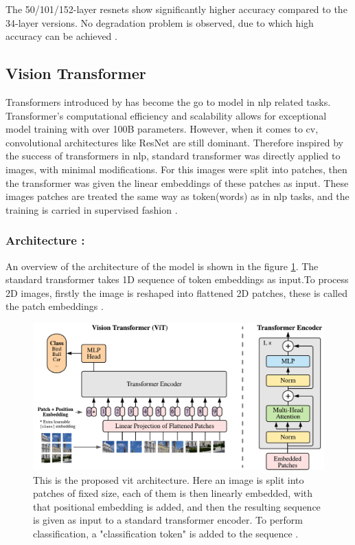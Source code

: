 The 50/101/152-layer \glspl{resnet} show significantly higher accuracy compared to the 34-layer versions. No degradation problem is observed, due to which high accuracy can be achieved \cite{he2016deep}.

\subsection{Vision Transformer}

Transformers introduced by \cite{vaswani2017attention} has become the go to model in \gls{nlp} related tasks. Transformer's computational efficiency and scalability allows for exceptional model training with over 100B parameters. However, when it comes to \gls{cv}, convolutional architectures like ResNet\cite{he2016deep} are still dominant. Therefore inspired by the success of transformers in \gls{nlp}, standard transformer was directly applied to images, with minimal modifications. For this images were split into patches, then the transformer was given the linear embeddings of these patches as input. These images patches are treated the same way as token(words) as in \gls{nlp} tasks, and the training is carried in supervised fashion \cite{dosovitskiy2020image}.

\subsubsection*{Architecture :}

An overview of the architecture of the model is shown in the figure \ref{fig:vit architecture}. The standard transformer takes 1D sequence of token embeddings as input.To process 2D images, firstly the image is reshaped into flattened 2D patches, these is called the patch embeddings \cite{dosovitskiy2020image}. 

\begin{figure}[ht!]
    \centering
    \includegraphics[width=1\linewidth]{Rohit_Master_Thesis//Images/vit_architecture.pdf}
    \caption{This is the proposed \gls{vit} architecture. Here an image is split into patches of fixed size, each of them is then linearly embedded, with that positional embedding is added, and then the resulting sequence is given as input to a standard transformer encoder. To perform classification, a "classification token" is added to the sequence \cite{dosovitskiy2020image}.}
    \label{fig:vit architecture}
\end{figure}

